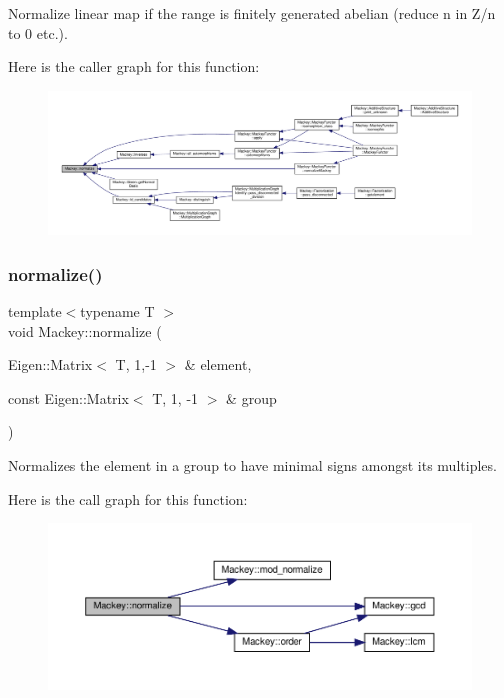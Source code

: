 Normalize linear map if the range is finitely generated abelian (reduce n in Z/n to 0 etc.). 

Here is the caller graph for this function\+:\nopagebreak
\begin{figure}[H]
\begin{center}
\leavevmode
\includegraphics[width=350pt]{namespaceMackey_a40d5c8d3e43cd2ee3df09664bc8c56ea_icgraph}
\end{center}
\end{figure}
\mbox{\label{namespaceMackey_a635c87980358b97256fe159f0c59bb80}} 
\subsubsection{\texorpdfstring{normalize()}{normalize()}\hspace{0.1cm}{\footnotesize\ttfamily [2/2]}}
{\footnotesize\ttfamily template$<$typename T $>$ \\
void Mackey\+::normalize (\begin{DoxyParamCaption}\item[{Eigen\+::\+Matrix$<$ T, 1,-\/1 $>$ \&}]{element,  }\item[{const Eigen\+::\+Matrix$<$ T, 1, -\/1 $>$ \&}]{group }\end{DoxyParamCaption})}



Normalizes the element in a group to have minimal signs amongst its multiples. 

Here is the call graph for this function\+:\nopagebreak
\begin{figure}[H]
\begin{center}
\leavevmode
\includegraphics[width=350pt]{namespaceMackey_a635c87980358b97256fe159f0c59bb80_cgraph}
\end{center}
\end{figure}
\mbox{\label{namespaceMackey_a463bb762b4edc2f283e8d1c0c466aedf}} 

